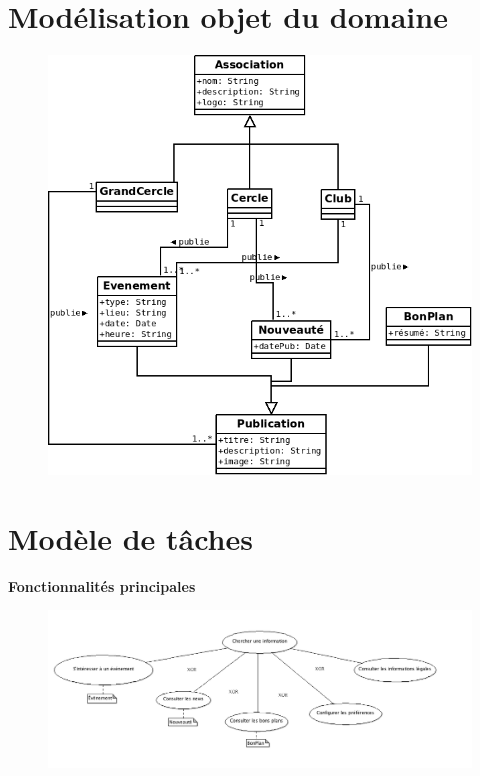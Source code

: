 \documentclass[a4paper, 11px]{article}
\begin{document}
\section{Modélisation objet du domaine}
\label{objet}
\begin{figure}[h]
\centering
\includegraphics[width = 13cm]{classes.png}
\end{figure}
\newpage

\section{Modèle de tâches}
\label{taches}

\textbf{Fonctionnalités principales}
\begin{figure}[h!]
\includegraphics[width=18cm]{taches_generales.png}
\end{figure}
\end{document}
